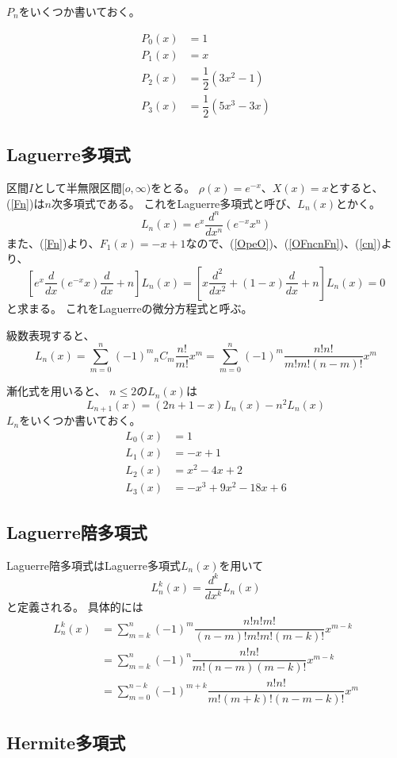 $P_n$をいくつか書いておく。

\begin{align}
  P_0(x) &= 1 \\
  P_1(x) &= x \\
  P_2(x) &= \dfrac{1}{2}(3x^2 - 1) \\
  P_3(x) &= \dfrac{1}{2}(5x^3 - 3x)
\end{align}

\subsection{Laguerre多項式}
区間$I$として半無限区間$[o,\infty)$をとる。
  $\rho(x) = e^{-x}$、$X(x) = x$とすると、(\ref{Fn})は$n$次多項式である。
  これをLaguerre多項式と呼び、$L_n(x)$とかく。
  \begin{equation}
    \label{laguerre_polynomials}
    L_n(x) = e^x\dfrac{d^n}{dx^n}(e^{-x}x^n)
  \end{equation}
  また、(\ref{Fn})より、$F_1(x) = -x+1$なので、(\ref{OpeO})、(\ref{OFncnFn})、(\ref{cn})より、
  \begin{equation}
    \label{laguerre_DE}
    \left[ e^x\dfrac{d}{dx}(e^{-x}x)\dfrac{d}{dx} + n\right]L_n(x) = \left[ x\dfrac{d^2}{dx^2} + (1-x)\dfrac{d}{dx} + n\right]L_n(x) = 0
  \end{equation}
  と求まる。
  これをLaguerreの微分方程式と呼ぶ。

  級数表現すると、
  \begin{equation}
    L_n(x) = \sum_{m = 0}^n (-1)^m {}_nC_m\dfrac{n!}{m!}x^m = \sum_{m = 0}^n (-1)^m\dfrac{n!n!}{m!m!(n-m)!}x^m
  \end{equation}

  漸化式を用いると、
  $n \leq 2$の$L_n(x)$は
  \begin{equation}
    L_{n+1}(x) = (2n + 1 -x)L_n(x) - n^2L_n(x)
  \end{equation}
  $L_n$をいくつか書いておく。
  \begin{align}
    L_0(x) &= 1 \\
    L_1(x) &= -x + 1 \\
    L_2(x) &= x^2 -4x + 2 \\
    L_3(x) &= -x^3 + 9x^2 -18x + 6
  \end{align}

  \subsection{Laguerre陪多項式}
  Laguerre陪多項式はLaguerre多項式$L_n(x)$を用いて
  \begin{equation}
    L_n^k(x) = \dfrac{d^k}{dx^k}L_n(x)
  \end{equation}
  と定義される。
  具体的には
  \begin{align}
    L_n^k(x) &= \sum_{m=k}^{n}(-1)^m \dfrac{n!n!m!}{(n-m)!m!m!(m-k)!}x^{m-k} \\
    &= \sum_{m=k}^{n}(-1)^n \dfrac{n!n!}{m!(n-m)(m-k)!}x^{m-k} \\
    &= \sum_{m=0}^{n-k}(-1)^{m+k} \dfrac{n!n!}{m!(m+k)!(n-m-k)!}x^{m}
  \end{align}




  \subsection{Hermite多項式}
